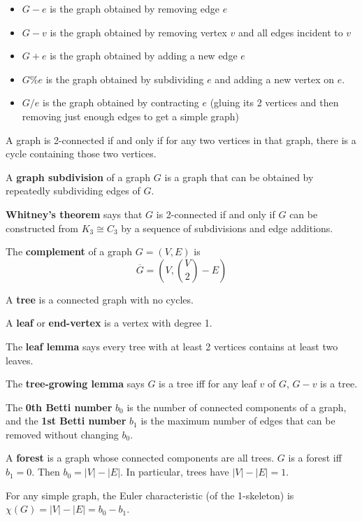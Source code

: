 \documentclass[10pt]{article}
\begin{document}
\par
\begin{itemize}[noitemsep]
    \item $G-e$ is the graph obtained by removing edge $e$
    \item $G-v$ is the graph obtained by removing vertex $v$ and all edges incident to $v$
    \item $G+e$ is the graph obtained by adding a new edge $e$
    \item $G\%e$ is the graph obtained by subdividing $e$ and adding a new vertex on $e$.
    \item $G/e$ is the graph obtained by contracting $e$ (gluing its 2 vertices and then removing just enough edges to get a simple graph)
\end{itemize}
\par
A graph is 2-connected if and only if for any two vertices in that graph, there is a cycle containing those two vertices.
\par
A \textbf{graph subdivision} of a graph $G$ is a graph that can be obtained by repeatedly subdividing edges of $G$.
\par
\textbf{Whitney's theorem} says that $G$ is 2-connected if and only if $G$ can be constructed from $K_3 \cong C_3$ by a sequence of subdivisions and edge additions.
\par
The \textbf{complement} of a graph $G=(V,E)$ is
\[ \overline{G} = \left( V, \binom{V}{2}-E \right) \]
\par
A \textbf{tree} is a connected graph with no cycles.
\par
A \textbf{leaf} or \textbf{end-vertex} is a vertex with degree 1.
\par
The \textbf{leaf lemma} says every tree with at least 2 vertices contains at least two leaves.
\par
The \textbf{tree-growing lemma} says $G$ is a tree iff for any leaf $v$ of $G$, $G-v$ is a tree.
\par
The \textbf{0th Betti number} $b_0$ is the number of connected components of a graph, and the \textbf{1st Betti number} $b_1$ is the maximum number of edges that can be removed without changing $b_0$.
\par
A \textbf{forest} is a graph whose connected components are all trees. $G$ is a forest iff $b_1=0$. Then $b_0=|V|-|E|$. In particular, trees have $|V|-|E|=1$.
\par
For any simple graph, the Euler characteristic (of the 1-skeleton) is $\chi(G)=|V|-|E|=b_0-b_1$.
\par
\end{document}
